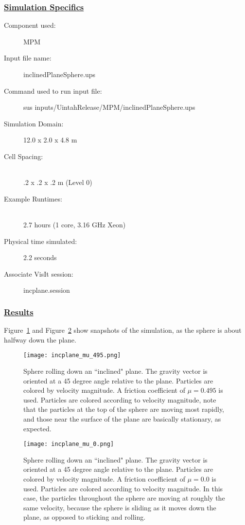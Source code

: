 \subsubsection*{\underline{Simulation Specifics}}
\begin{description} 
\item [Component used:] \hfill MPM
\item [Input file name:] \hfill inclinedPlaneSphere.ups
\item [Command used to run input file:]\hfill sus inputs/UintahRelease/MPM/inclinedPlaneSphere.ups
\item [Simulation Domain:]\hfill    12.0 x 2.0 x 4.8 m

\item [Cell Spacing:]\hfill \\ 
.2 x .2 x .2 m (Level 0)

\item [Example Runtimes:] \hfill \\
 2.7 hours  (1 core, 3.16 GHz Xeon)\\

\item [Physical time simulated:] \hfill 2.2 seconds

\item [Associate VisIt session:] \hfill incplane.session

\end{description}

\subsubsection*{\underline{Results}}
Figure~\ref{figincplaneSphere_bigmu} and Figure~\ref{figincplaneSphere_0mu}
show snapshots of the simulation, as
the sphere is about halfway down the plane.
\begin{figure}
  \center
  \vspace{-35pt}
  \texttt{[image: incplane\_mu\_495.png]}
  \caption{Sphere rolling down an ``inclined" plane.  The gravity vector
is oriented at a 45 degree angle relative to the plane.  Particles are colored
by velocity magnitude. A friction coefficient of $\mu = 0.495$ is used.
Particles are colored according
to velocity magnitude, note that the particles at the top of the sphere
are moving most rapidly, and those near the surface of the plane are 
basically stationary, as expected.}
  \label{figincplaneSphere_bigmu}
\end{figure}

\begin{figure}
  \center
  \vspace{-15pt}
  \texttt{[image: incplane\_mu\_0.png]}
  \caption{Sphere rolling down an ``inclined" plane.  The gravity vector
is oriented at a 45 degree angle relative to the plane.  Particles are colored
by velocity magnitude.  A friction coefficient of $\mu = 0.0$ is used.
Particles are colored according to velocity magnitude.  In this case,
the particles throughout the sphere are moving at roughly the same velocity,
because the sphere is sliding as it moves down the plane, as opposed to
sticking and rolling.}
  \label{figincplaneSphere_0mu}
\end{figure}

